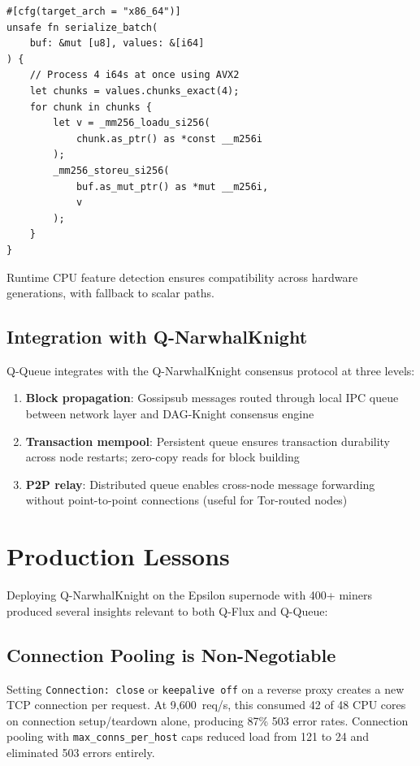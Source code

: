 \documentclass[11pt,a4paper,twocolumn]{article}
\begin{document}
\begin{lstlisting}
#[cfg(target_arch = "x86_64")]
unsafe fn serialize_batch(
    buf: &mut [u8], values: &[i64]
) {
    // Process 4 i64s at once using AVX2
    let chunks = values.chunks_exact(4);
    for chunk in chunks {
        let v = _mm256_loadu_si256(
            chunk.as_ptr() as *const __m256i
        );
        _mm256_storeu_si256(
            buf.as_mut_ptr() as *mut __m256i,
            v
        );
    }
}
\end{lstlisting}

Runtime CPU feature detection ensures compatibility across hardware generations, with fallback to scalar paths.

\subsection{Integration with Q-NarwhalKnight}

Q-Queue integrates with the Q-NarwhalKnight consensus protocol at three levels:

\begin{enumerate}[nosep]
\item \textbf{Block propagation}: Gossipsub messages routed through local IPC queue between network layer and DAG-Knight consensus engine
\item \textbf{Transaction mempool}: Persistent queue ensures transaction durability across node restarts; zero-copy reads for block building
\item \textbf{P2P relay}: Distributed queue enables cross-node message forwarding without point-to-point connections (useful for Tor-routed nodes)
\end{enumerate}

\section{Production Lessons}

Deploying Q-NarwhalKnight on the Epsilon supernode with 400+ miners produced several insights relevant to both Q-Flux and Q-Queue:

\subsection{Connection Pooling is Non-Negotiable}

Setting \texttt{Connection: close} or \texttt{keepalive off} on a reverse proxy creates a new TCP connection per request. At 9,600~req/s, this consumed 42 of 48 CPU cores on connection setup/teardown alone, producing 87\% 503 error rates. Connection pooling with \texttt{max\_conns\_per\_host} caps reduced load from 121 to 24 and eliminated 503 errors entirely.
\end{document}
